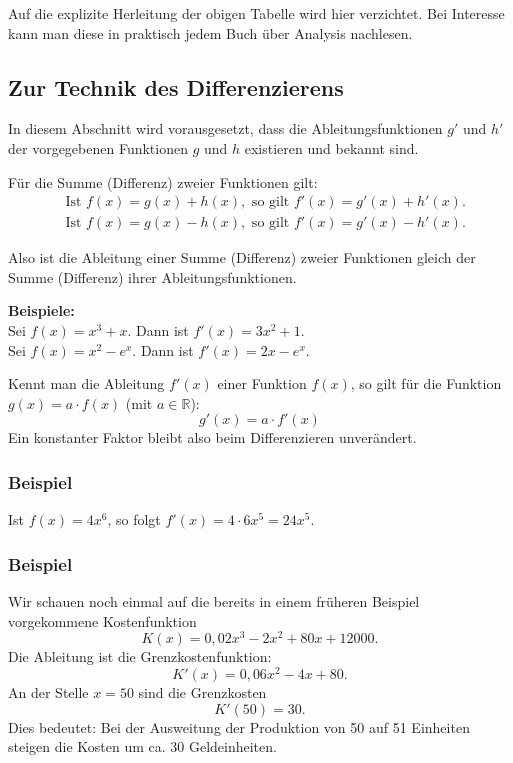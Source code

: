 Auf die explizite Herleitung der obigen Tabelle wird hier verzichtet. Bei Interesse kann man diese in praktisch jedem Buch über Analysis nachlesen.

\subsection{Zur Technik des Differenzierens}

In diesem Abschnitt wird vorausgesetzt, dass die Ableitungsfunktionen $g'$ und $h'$ der vorgegebenen Funktionen $g$ und $h$ existieren und bekannt sind.


Für die Summe (Differenz) zweier Funktionen gilt:
\begin{align*}
  &\text{Ist } f(x) = g(x) + h(x), \text{ so gilt } f'(x) = g'(x) + h'(x) .\\
  &\text{Ist } f(x) = g(x) - h(x), \text{ so gilt } f'(x) = g'(x) - h'(x) .
\end{align*}

Also ist die Ableitung einer Summe (Differenz) zweier Funktionen gleich der Summe (Differenz) ihrer Ableitungsfunktionen.

\textbf{Beispiele:}\\
Sei $f(x) = x^3 + x$. Dann ist $f'(x) = 3x^2 + 1$.\\
Sei $f(x) = x^2 - e^x$. Dann ist $f'(x) = 2x - e^x$.\beispielende


Kennt man die Ableitung $f'(x)$ einer Funktion $f(x)$, so gilt für die Funktion $g(x) = a \cdot f(x)$ (mit $a \in \mathbb{R}$):
\[ g'(x) = a \cdot f'(x) \]
Ein konstanter Faktor bleibt also beim Differenzieren unverändert.

\subsubsection{Beispiel}

Ist $f(x) = 4x^6$, so folgt $f'(x) = 4 \cdot 6x^5 = 24x^5$.\beispielende

\subsubsection{Beispiel}

Wir schauen noch einmal auf die bereits in einem früheren Beispiel vorgekommene Kostenfunktion
\[ K(x) = 0{,}02x^3 - 2x^2 + 80x + 12000 . \]
Die Ableitung ist die Grenzkostenfunktion:
\[ K'(x) = 0{,}06x^2 - 4x + 80 . \]
An der Stelle $x = 50$ sind die Grenzkosten
\[ K'(50) = 30 . \]
Dies bedeutet: Bei der Ausweitung der Produktion von 50 auf 51 Einheiten steigen die Kosten um ca. 30 Geldeinheiten.\beispielende

